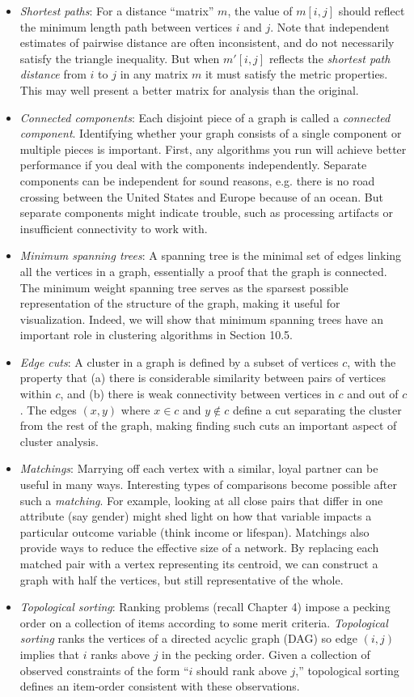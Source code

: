 \documentclass[10pt]{article}
\begin{document}
\begin{itemize}
    \item \textit{Shortest paths}: For a distance “matrix” $m$, the value of $m[i, j]$ should reflect the minimum length path between vertices $i$ and $j$. Note that independent estimates of pairwise distance are often inconsistent, and do not necessarily satisfy the triangle inequality. But when $m'[i, j]$ reflects the \textit{shortest path distance} from $i$ to $j$ in any matrix $m$ it must satisfy the metric properties. This may well present a better matrix for analysis than the original.
    \item \textit{Connected components}: Each disjoint piece of a graph is called a \textit{connected component}. Identifying whether your graph consists of a single component or multiple pieces is important. First, any algorithms you run will achieve better performance if you deal with the components independently. Separate components can be independent for sound reasons, e.g. there is no road crossing between the United States and Europe because of an ocean. But separate components might indicate trouble, such as processing artifacts or insufficient connectivity to work with.
    \item \textit{Minimum spanning trees}: A spanning tree is the minimal set of edges linking all the vertices in a graph, essentially a proof that the graph is connected. The minimum weight spanning tree serves as the sparsest possible representation of the structure of the graph, making it useful for visualization. Indeed, we will show that minimum spanning trees have an important role in clustering algorithms in Section 10.5.
    \item \textit{Edge cuts}: A cluster in a graph is defined by a subset of vertices $c$, with the property that (a) there is considerable similarity between pairs of vertices within $c$, and (b) there is weak connectivity between vertices in $c$ and out of $c$. The edges $(x, y)$ where $x \in c$ and $y \notin c$ define a cut separating the cluster from the rest of the graph, making finding such cuts an important aspect of cluster analysis.
    \item \textit{Matchings}: Marrying off each vertex with a similar, loyal partner can be useful in many ways. Interesting types of comparisons become possible after such a \textit{matching}. For example, looking at all close pairs that differ in one attribute (say gender) might shed light on how that variable impacts a particular outcome variable (think income or lifespan). Matchings also provide ways to reduce the effective size of a network. By replacing each matched pair with a vertex representing its centroid, we can construct a graph with half the vertices, but still representative of the whole.
    \item \textit{Topological sorting}: Ranking problems (recall Chapter 4) impose a pecking order on a collection of items according to some merit criteria. \textit{Topological sorting} ranks the vertices of a directed acyclic graph (DAG) so edge $(i, j)$ implies that $i$ ranks above $j$ in the pecking order. Given a collection of observed constraints of the form “$i$ should rank above $j$,” topological sorting defines an item-order consistent with these observations.
\end{itemize}
\end{document}
